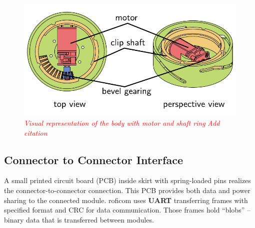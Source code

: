 \documentclass[
  digital,     %
  oneside,     %
  nosansbold,  %
  nocolorbold, %
  lof,         %
  lot,         %
]{fithesis4}
\newcommand{\TODO}[1]{\textcolor{red}{\textit{#1}}}
\begin{document}
\begin{figure}
    \centering
    \includegraphics{ dock_arrangement.pdf }
    \caption{ \TODO{ Visual representation of the body with motor and shaft ring } \TODO{Add citation} }
    \label{ fig:dock-arrangement }
\end{figure}

\subsection{ Connector to Connector Interface }

A small printed circuit board (PCB) inside skirt with spring-loaded pins realizes the connector-to-connector connection. This PCB provides both
data and power sharing to the connected module.
\acrshort{roficom} uses \textbf{UART} transferring frames with specified format and CRC for data communication. Those frames hold ``blobs'' --
binary data that is transferred between modules. 
\end{document}
